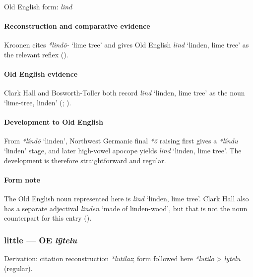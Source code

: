 \documentclass[
  british,
  a4paper,
]{article}
\providecommand{\Recon}[1]{\emph{*#1}}
\begin{document}
Old English form: \emph{lind}

\paragraph{Reconstruction and comparative
evidence}\label{reconstruction-and-comparative-evidence-45}

Kroonen cites \emph{*lindō-} `lime tree' and gives Old English
{\emph{lind}} `linden, lime tree' as the relevant reflex
().

\paragraph{Old English evidence}\label{old-english-evidence-46}

Clark Hall and Bosworth-Toller both record {\emph{lind}} `linden, lime
tree' as the noun `lime-tree, linden'
(;
).

\paragraph{Development to Old
English}\label{development-to-old-english-46}

From \Recon{líndō} `linden', Northwest Germanic final \emph{*ō} raising
first gives a \Recon{líndu} `linden' stage, and later high-vowel apocope
yields {\emph{lind}} `linden, lime tree'. The development is therefore
straightforward and regular.

\paragraph{Form note}\label{form-note-12}

The Old English noun represented here is {\emph{lind}} `linden, lime
tree'. Clark Hall also has a separate adjectival \emph{linden} `made of
linden-wood', but that is not the noun counterpart for this entry
().

\subsubsection{\texorpdfstring{little --- OE
\emph{lȳtelu}}{little --- OE lȳtelu}}\label{little-oe-lux233telu}

Derivation: citation reconstruction \emph{*lūtilaz}; form followed here
\emph{*lūtilō} \textgreater{} \emph{lȳtelu} (regular).
\end{document}
